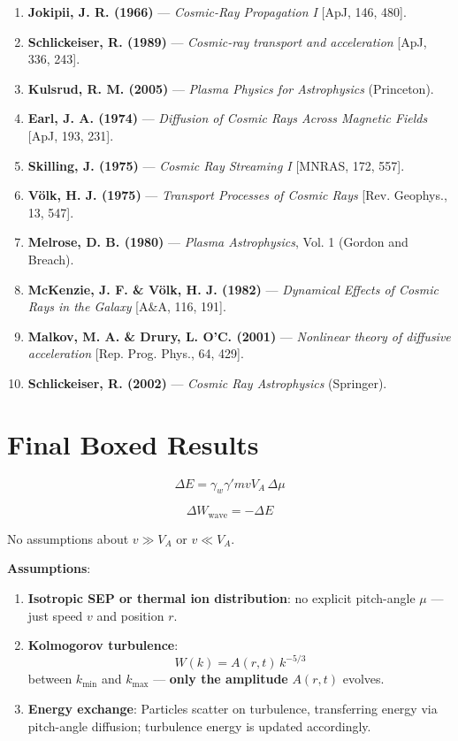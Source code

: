 \begin{enumerate}
    \item \textbf{Jokipii, J. R. (1966)} --- \textit{Cosmic-Ray Propagation I} [ApJ, 146, 480].
    \item \textbf{Schlickeiser, R. (1989)} --- \textit{Cosmic-ray transport and acceleration} [ApJ, 336, 243].
    \item \textbf{Kulsrud, R. M. (2005)} --- \textit{Plasma Physics for Astrophysics} (Princeton).
    \item \textbf{Earl, J. A. (1974)} --- \textit{Diffusion of Cosmic Rays Across Magnetic Fields} [ApJ, 193, 231].
    \item \textbf{Skilling, J. (1975)} --- \textit{Cosmic Ray Streaming I} [MNRAS, 172, 557].
    \item \textbf{Völk, H. J. (1975)} --- \textit{Transport Processes of Cosmic Rays} [Rev. Geophys., 13, 547].
    \item \textbf{Melrose, D. B. (1980)} --- \textit{Plasma Astrophysics}, Vol. 1 (Gordon and Breach).
    \item \textbf{McKenzie, J. F. \& Völk, H. J. (1982)} --- \textit{Dynamical Effects of Cosmic Rays in the Galaxy} [A\&A, 116, 191].
    \item \textbf{Malkov, M. A. \& Drury, L. O'C. (2001)} --- \textit{Nonlinear theory of diffusive acceleration} [Rep. Prog. Phys., 64, 429].
    \item \textbf{Schlickeiser, R. (2002)} --- \textit{Cosmic Ray Astrophysics} (Springer).
\end{enumerate}

\hrulefill

\section*{\texorpdfstring{ \textbf{Final Boxed Results}}{}}

\begin{equation}
\boxed{ \Delta E = \gamma_w \gamma' m v V_A \, \Delta \mu }
\end{equation}

\begin{equation}
\boxed{ \Delta W_{\text{wave}} = - \Delta E }
\end{equation}

No assumptions about $v \gg V_A$ or $v \ll V_A$.



\textbf{Assumptions}:
\begin{enumerate}
    \item \textbf{Isotropic SEP or thermal ion distribution}: no explicit pitch-angle $\mu$ --- just speed $v$ and position $r$.
    \item \textbf{Kolmogorov turbulence}:
    \[
    W(k) = A(r, t)\,k^{-5/3}
    \]
    between $k_{\min}$ and $k_{\max}$ --- \textbf{only the amplitude} $A(r, t)$ evolves.
    \item \textbf{Energy exchange}: Particles scatter on turbulence, transferring energy via pitch-angle diffusion; turbulence energy is updated accordingly.
\end{enumerate}


